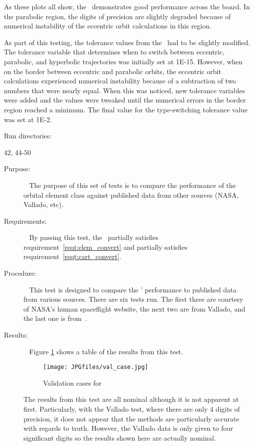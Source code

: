 \begin{description}
As these plots all show, the \OrbitalElement\ demonstrates good
performance across the board.  In the parabolic region, the digits of
precision are slightly degraded because of numerical instability of the
eccentric orbit calculations in this region.

As part of this testing, the tolerance values from the \OrbitalElement\ had to be
slightly modified.  The tolerance variable that determines when to switch
between eccentric, parabolic, and hyperbolic trajectories was initially
set at 1E-15.  However, when on the border between eccentric and parabolic
orbits, the eccentric orbit calculations experienced numerical instability
because of a subtraction of two numbers that were nearly equal.  When this was
noticed, new tolerance variables were added and the values were tweaked until
the numerical errors in the border region reached a minimum.  The final value
for the type-switching tolerance value was set at 1E-2.

Run directories:

42, 44-50

\end{description}

\label{test:val_case}
\begin{description}
\item[Purpose:] \ \newline
The purpose of this set of tests is to compare the performance of the orbital
element class against published data from other sources (NASA, Vallado, etc).
\item[Requirements:] \ \newline
By passing this test, the \OrbitalElement\ partially satisfies
requirement~\ref{reqt:elem_convert} and partially satisfies
requirement~\ref{reqt:cart_convert}.
\item[Procedure:]\ \newline
This test is designed to compare the \OrbitalElement' performance to
published data from various sources.  There are six tests run.  The first
three are courtesy of NASA's human spaceflight website, the next two are from
Vallado, and the last one is from~\cite{BMW}.

\item[Results:]\ \newline
Figure \ref{val_cases} shows a table of the results from this test.
\begin{figure}[h]
\begin{center}
\texttt{[image: JPGfiles/val\_case.jpg]}
\caption{Validation cases for \OrbitalElement}
\label{val_cases}
\end{center}
\end{figure}

The results from this test are all nominal although it is not apparent at
first.  Particularly, with the Vallado test, where there are only 4 digits
of precision, it does not appear that the methods are particularly accurate
with regards to truth.  However, the Vallado data is only given to four
significant digits so the results shown here are actually nominal.

\end{description}

